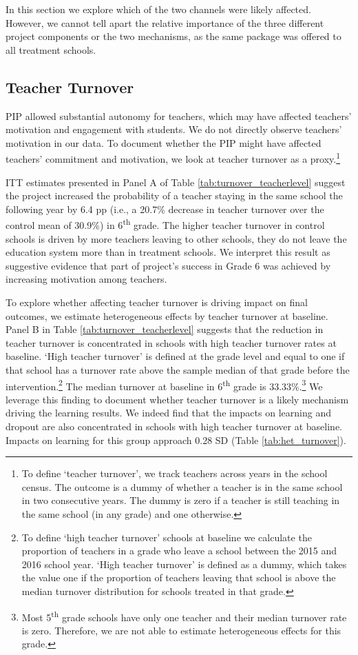 \documentclass[11pt,a4paper]{article}
\begin{document}
In this section we explore which of the two channels were likely affected. However, we cannot tell apart the relative importance of the three different project components or the two mechanisms, as the same package was offered to all treatment schools.  

\subsection{Teacher Turnover} \label{sec:turnover}

PIP allowed substantial autonomy for teachers, which may have affected teachers' motivation and engagement with students. We do not directly observe teachers' motivation in our data. To document whether the PIP might have affected teachers' commitment and motivation, we look at teacher turnover as a proxy.\footnote{To define `teacher turnover', we track teachers across years in the school census. The outcome is a dummy of whether a teacher is in the same school in two consecutive years. The dummy is zero if a teacher is still teaching in the same school (in any grade) and one otherwise.} 

ITT estimates presented in Panel A of Table \ref{tab:turnover_teacherlevel} suggest the project increased the probability of a teacher staying in the same school the following year by 6.4 pp (i.e., a 20.7\% decrease in teacher turnover over the control mean of 30.9\%) in 6\textsuperscript{th} grade. The higher teacher turnover in control schools is driven by more teachers leaving to other schools, they do not leave the education system more than in treatment schools. We interpret this result as suggestive evidence that part of project's success in Grade 6 was achieved by increasing motivation among teachers. 

To explore whether affecting teacher turnover is driving impact on final outcomes, we estimate heterogeneous effects by teacher turnover at baseline. Panel B in Table \ref{tab:turnover_teacherlevel} suggests that the reduction in teacher turnover is concentrated in schools with high teacher turnover rates at baseline. `High teacher turnover' is defined at the grade level and equal to one if that school has a turnover rate above the sample median of that grade before the intervention.\footnote{To define `high teacher turnover' schools at baseline we calculate the proportion of teachers in a grade who leave a school between the 2015 and 2016 school year. `High teacher turnover' is defined as a dummy, which takes the value one if the proportion of teachers leaving that school is above the median turnover distribution for schools treated in that grade.} The median turnover at baseline in 6\textsuperscript{th} grade is 33.33\%.\footnote{Most 5\textsuperscript{th} grade schools have only one teacher and their median turnover rate is zero. Therefore, we are not able to estimate heterogeneous effects for this grade.} We leverage this finding to document whether teacher turnover is a likely mechanism driving the learning results. We indeed find that the impacts on learning and dropout are also concentrated in schools with high teacher turnover at baseline. Impacts on learning for this group approach 0.28 SD (Table  \ref{tab:het_turnover}). 
\end{document}
